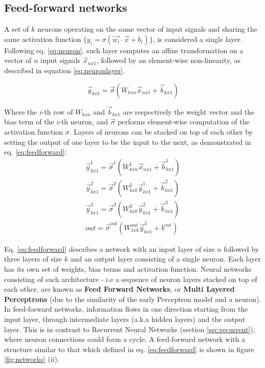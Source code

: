 \subsection{Feed-forward networks}

A set of \(k\) neurons operating on the same vector of input signals and sharing the same activation function \(\{y_i = \sigma(\vec{w_i}\cdot\vec{x} + b_i)\}\), is considered a single layer. Following eq. \ref{eq:neuron}, such layer computes an affine transformation on a vector of \(n\) input signals  \(\vec{x}_{nx1}\), followed by an element-wise non-linearity, as described in equation \ref{eq:neuronlayer}. 

\begin{equation}
    \vec{y}_{kx1} = \vec{\sigma}({W_{kxn}\vec{x}_{nx1}} + \vec{b}_{kx1})
    \label{eq:neuronlayer}
\end{equation}

Where the \(i\)-th row of \(W_{kxn}\) and \(\vec{b}_{kx1}\) are respectively the weight vector and the bias term of the \(i\)-th neuron, and \(\vec{\sigma}\) performs element-wise computation of the activation function \(\sigma\). Layers of neurons can be stacked on top of each other by setting the output of one layer to be the input to the next, as demonstrated in eq. \ref{eq:feedforward}:
\begin{equation}
    \begin{split}
    \vec{y}^1_{kx1} = \vec{\sigma}^1({W^1_{kxn}\vec{x}_{nx1}} + \vec{b}^1_{kx1}) \\
    \vec{y}^2_{kx1} = \vec{\sigma}^2({W^2_{kxk}\vec{y}^1_{kx1}} + \vec{b}^2_{kx1}) \\
    \vec{y}^3_{kx1} = \vec{\sigma}^3({W^3_{kxk}\vec{y}^2_{kx1}} + \vec{b}^3_{kx1}) \\
    out = \vec{\sigma}^{out}({W^{out}_{1xk}\vec{y}^3_{kx1}} + b^{out})
    \end{split}
    \label{eq:feedforward}
\end{equation}

Eq. \ref{eq:feedforward} describes a network with an input layer of size \(n\) followed by three layers of size \(k\) and an output layer consisting of a single neuron. Each layer has its own set of weights, bias terms and activation function. Neural networks consisting of such architecture - i.e a sequence of neuron layers stacked on top of each other, are known as \textbf{Feed Forward Networks}, or \textbf{Multi Layered Perceptrons} (due to the similarity of the early Perceptron model and a neuron). In feed-forward networks, information flows in one direction starting from the input layer, through intermediate layers (a.k.a hidden layers) and the output layer. This is in contrast to Recurrent Neural Networks (section \ref{sec:recurrent}), where neuron connections could form a cycle. A feed-forward network with a structure similar to that which defined in eq. \ref{eq:feedforward} is shown in figure \ref{fig:networks} (ii).


